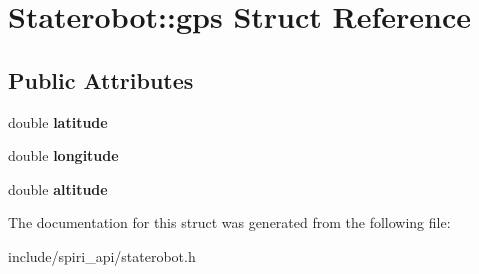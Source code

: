 \hypertarget{struct_staterobot_1_1gps}{\section{\-Staterobot\-:\-:gps \-Struct \-Reference}
\label{struct_staterobot_1_1gps}
}
\subsection*{\-Public \-Attributes}
\begin{DoxyCompactItemize}
\item 
\hypertarget{struct_staterobot_1_1gps_a2fdc1aa51f9b10e9b64352cbcda93cff}{double {\bfseries latitude}}\label{struct_staterobot_1_1gps_a2fdc1aa51f9b10e9b64352cbcda93cff}

\item 
\hypertarget{struct_staterobot_1_1gps_a3df8c628bc3a8f7bf1a19fd1164d77ce}{double {\bfseries longitude}}\label{struct_staterobot_1_1gps_a3df8c628bc3a8f7bf1a19fd1164d77ce}

\item 
\hypertarget{struct_staterobot_1_1gps_a97eadda43f95e9b66dfc082b00ff3c66}{double {\bfseries altitude}}\label{struct_staterobot_1_1gps_a97eadda43f95e9b66dfc082b00ff3c66}

\end{DoxyCompactItemize}


\-The documentation for this struct was generated from the following file\-:\begin{DoxyCompactItemize}
\item 
include/spiri\-\_\-api/staterobot.\-h\end{DoxyCompactItemize}
